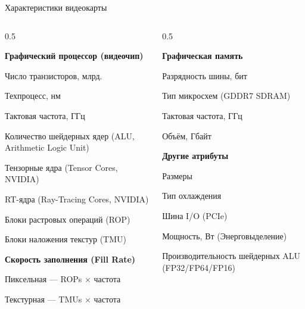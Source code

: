 \documentclass{beamer}
\begin{document}
\begin{frame}{Характеристики видеокарты}{}

	\begin{columns}
		\begin{column}{0.5\textwidth}
			{\footnotesize

			\textbf{Графический процессор (видеочип)}

			Число транзисторов, млрд.
	
			Техпроцесс, нм
			
			Тактовая частота, ГГц
			
			Количество шейдерных ядер (ALU, Arithmetic Logic Unit)
			
			Тензорные ядра (Tensor Cores, NVIDIA)
		
			RT-ядра (Ray-Tracing Cores, NVIDIA)

			Блоки растровых операций (ROP)

			Блоки наложения текстур (TMU)

			\vspace{1em}

			\textbf{Скорость заполнения (Fill Rate)}
							
			Пиксельная --- ROPs $\times$ частота
				
			Текстурная --- TMUs $\times$ частота

		
			}
		\end{column}
		\begin{column}{0.5\textwidth}
			{\footnotesize

			\textbf{Графическая память}
		
			Разрядность шины, бит
			
			Тип микросхем (GDDR7 SDRAM)
			
			Тактовая частота, ГГц
			
			Объём, Гбайт

			\vspace{1em}

			\textbf{Другие атрибуты}
			
			Размеры
			
			Тип охлаждения
			
			Шина I/O (PCIe)
			
			Мощность, Вт (Энерговыделение)
			
			Производительность шейдерных ALU (FP32/FP64/FP16)


			}
		\end{column}
	\end{columns}


\end{frame}
\end{document}
